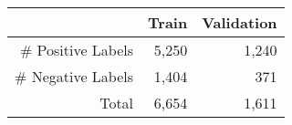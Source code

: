 \begin{tabular}{rrr}

                    &  \textbf{Train}    &  \textbf{Validation}   \\ 
\midrule
\# Positive Labels  & 5,250                 & 1,240 \\
\# Negative Labels  & 1,404                 & 371 \\
\midrule
Total               & 6,654                 & 1,611 \\

\end{tabular}